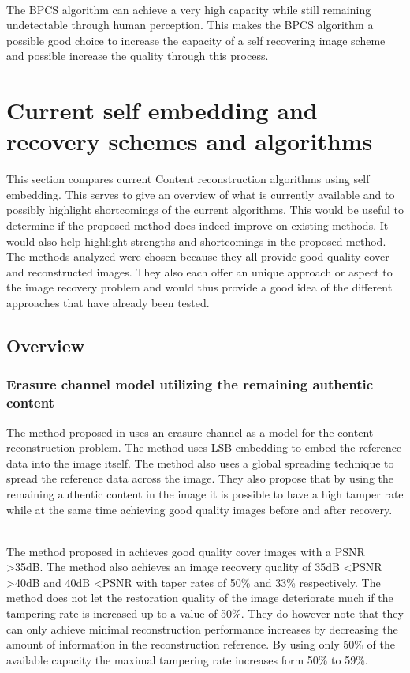 \documentclass[11pt]{article}
\begin{document}
\hspace{0pt} \\
The BPCS algorithm can achieve a very high capacity while still remaining undetectable through human perception.
This makes the BPCS algorithm a possible good choice to increase the capacity of a self recovering image scheme and possible increase the quality through this process.


\section{Current self embedding and recovery schemes and algorithms}

This section compares current Content reconstruction algorithms using self embedding.
This serves to give an overview of what is currently available and to possibly highlight shortcomings of the current algorithms.
This would be useful to determine if the proposed method does indeed improve on existing methods. 
It would also help highlight strengths and shortcomings in the proposed method.
The methods analyzed were chosen because they all provide good quality cover and reconstructed images.
They also each offer an unique approach or aspect to the image recovery problem and would thus provide a good idea of the different approaches that have already been tested.

\subsection{Overview}

\subsubsection{Erasure channel model utilizing the remaining authentic content}
\label{ErasureChannelOverview}
The method proposed in \cite {korus2013efficient} uses an erasure channel as a model for the content reconstruction problem.
The method uses LSB embedding to embed the reference data into the image itself.
The method also uses a global spreading technique to spread the reference data across the image.
They also propose that by using the remaining authentic content in the image it is possible to have a high tamper rate while at the same time achieving good quality images before and after recovery.

\hspace{0pt} \\
The method proposed in \cite {korus2013efficient} achieves good quality cover images with a PSNR \textgreater 35dB. 
The method also achieves an image recovery quality of 35dB \textless PSNR \textgreater 40dB and 40dB \textless PSNR with taper rates of 50\% and 33\% respectively.
The method does not let the restoration quality of the image deteriorate much if the tampering rate is increased up to a value of 50\%.
They do however note that they can only achieve minimal reconstruction performance increases by decreasing the amount of information in the reconstruction reference.
By using only 50\% of the available capacity the maximal tampering rate increases form 50\% to 59\%.
\end{document}
